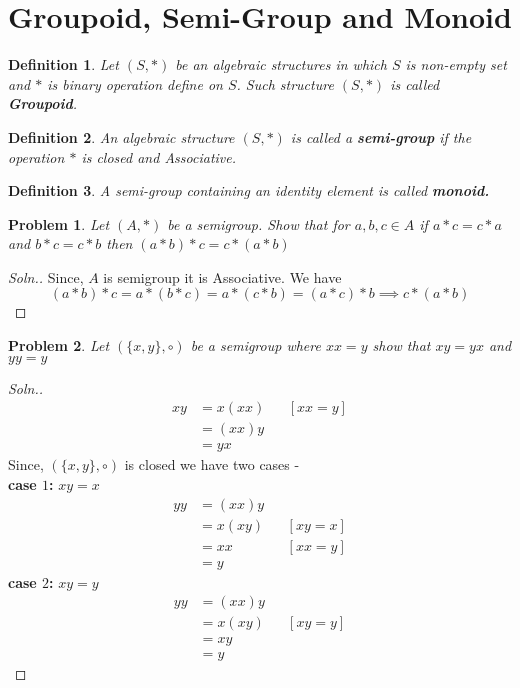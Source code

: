 \documentclass[12pt,a4paper]{article}
\newtheorem{defn}{Definition}
\newtheorem{pbm}{Problem}
\begin{document}
  \section{Groupoid, Semi-Group and Monoid}
  \begin{defn}
    Let $(S,*)$ be an algebraic structures in which $S$ is non-empty set and $*$ is binary operation define on $S$. Such structure $(S,*)$ is called \textbf{Groupoid}.
  \end{defn}
  \begin{defn}
   An algebraic structure  $(S,*)$ is called a \textbf{semi-group} if the operation $*$ is closed and Associative.
  \end{defn}
  \begin{defn}
    A semi-group containing an identity element is called \textbf{monoid.}
  \end{defn}
  \begin{pbm}
    Let $(A,*)$ be a semigroup. Show that for $a,b,c \in A$ if $a*c=c*a$ and $b*c=c*b$ then $(a*b)*c=c*(a*b)$
  \end{pbm}
  \begin{proof}[Soln.]
  Since, $A$ is semigroup it is Associative. We have $$(a*b)*c=a*(b*c)=a*(c*b)=(a*c)*b \implies c*(a*b)$$
  \end{proof}
  \begin{pbm}
    Let $(\{x,y\},\circ)$ be a semigroup where $xx=y$ show that $xy=yx$ and $yy=y$
  \end{pbm}
  \begin{proof}[Soln.]
  \[
    \begin{aligned}
    xy &= x(xx)   && \text{$[xx=y]$} \\
    &= (xx)y \\
    &= yx
    \end{aligned}
  \]
  Since, $(\{x,y\},\circ)$ is closed we have two cases -\\
  \textbf{case $1$: } $xy=x$
  \[
  \begin{aligned}
    yy &= (xx)y \\
    &= x(xy)    && \text{$[xy=x]$} \\
    &= xx     && \text{$[xx=y]$} \\
    &= y
  \end{aligned}
  \]
  \textbf{case $2$: } $xy=y$
  \[
  \begin{aligned}
    yy &= (xx)y \\
    &= x(xy)    && \text{$[xy=y]$} \\
    &= xy  \\
    &= y
  \end{aligned}
  \]
  \end{proof}
\end{document}
